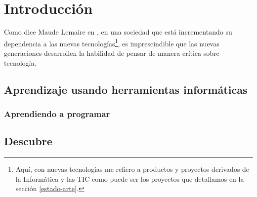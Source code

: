 \chapter{Introducción}\label{introduccion}

Como dice Maude Lemaire en \cite{lemaire2014incorporating}, en una sociedad que está incrementando su dependencia a las nuevas tecnologías\footnote{Aquí, con nuevas tecnologías me refiero a productos y proyectos derivados de la Informática y las \acrfull{TIC} como puede ser los proyectos que detallamos en la sección \ref{estado-arte}.}, es imprescindible que las nuevas generaciones desarrollen la habilidad de pensar de manera crítica sobre tecnología.






\section{Aprendizaje usando herramientas informáticas}
\label{sec:aprendizaje}

\subsection{Aprendiendo a programar}
\label{sub:aprendiendo-programar}

\section{Descubre}
\label{sec:descubre}


